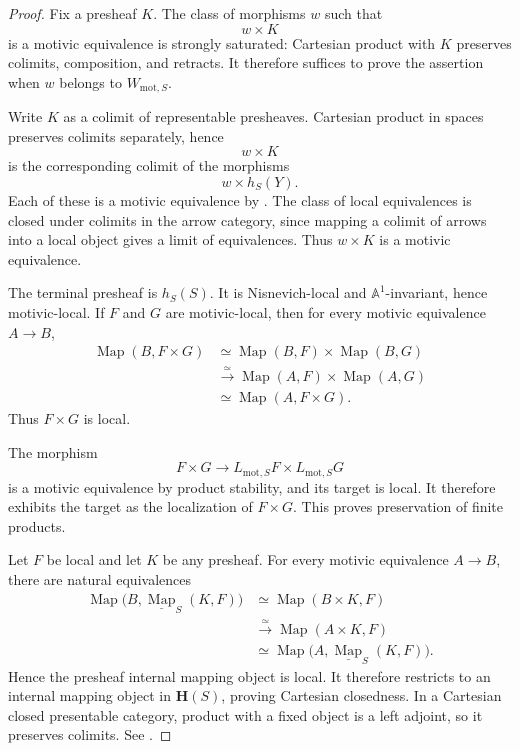 \begin{proof}
Fix a presheaf \(K\).  The class of morphisms \(w\) such that
\[
    w\times K
\]
is a motivic equivalence is strongly saturated: Cartesian product with
\(K\) preserves colimits, composition, and retracts.  It therefore
suffices to prove the assertion when \(w\) belongs to
\(W_{\mathrm{mot},S}\).

Write \(K\) as a colimit of representable presheaves.  Cartesian product
in spaces preserves colimits separately, hence
\[
    w\times K
\]
is the corresponding colimit of the morphisms
\[
    w\times h_S(Y).
\]
Each of these is a motivic equivalence by
.  The class of local
equivalences is closed under colimits in the arrow category, since
mapping a colimit of arrows into a local object gives a limit of
equivalences.  Thus \(w\times K\) is a motivic equivalence.

The terminal presheaf is \(h_S(S)\).  It is Nisnevich-local and
\(\mathbb A^1\)-invariant, hence motivic-local.  If \(F\) and \(G\) are
motivic-local, then for every motivic equivalence \(A\to B\),
\[
\begin{aligned}
    \operatorname{Map}(B,F\times G)
    &\simeq
    \operatorname{Map}(B,F)
    \times
    \operatorname{Map}(B,G)
    \\
    &\xrightarrow{\simeq}
    \operatorname{Map}(A,F)
    \times
    \operatorname{Map}(A,G)
    \\
    &\simeq
    \operatorname{Map}(A,F\times G).
\end{aligned}
\]
Thus \(F\times G\) is local.

The morphism
\[
    F\times G
    \longrightarrow
    L_{\mathrm{mot},S}F
    \times
    L_{\mathrm{mot},S}G
\]
is a motivic equivalence by product stability, and its target is local.
It therefore exhibits the target as the localization of \(F\times G\).
This proves preservation of finite products.

Let \(F\) be local and let \(K\) be any presheaf.  For every motivic
equivalence \(A\to B\), there are natural equivalences
\[
\begin{aligned}
    \operatorname{Map}
    \bigl(
        B,
        \underline{\operatorname{Map}}_S(K,F)
    \bigr)
    &\simeq
    \operatorname{Map}(B\times K,F)
    \\
    &\xrightarrow{\simeq}
    \operatorname{Map}(A\times K,F)
    \\
    &\simeq
    \operatorname{Map}
    \bigl(
        A,
        \underline{\operatorname{Map}}_S(K,F)
    \bigr).
\end{aligned}
\]
Hence the presheaf internal mapping object is local.  It therefore
restricts to an internal mapping object in \(\mathbf H(S)\), proving
Cartesian closedness.  In a Cartesian closed presentable category,
product with a fixed object is a left adjoint, so it preserves colimits.
See \cite{LurieHA,KhanBraveNewMotivicI}.
\end{proof}

